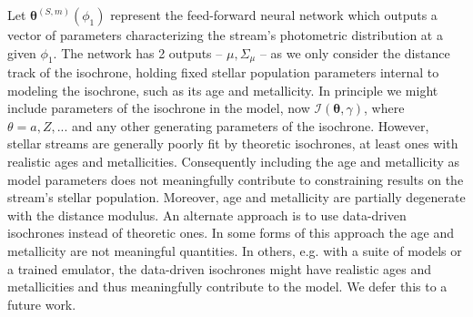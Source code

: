\documentclass[twocolumn]{aastex631}
\newcommand{\mbs}[1]{\boldsymbol{#1}}
\newcommand{\mcal}[1]{\mathcal{#1}}
\newcommand{\smallcomponent}[2]{#2^{\scriptscriptstyle (#1)}}
\newcommand{\cmp}[2]{\smallcomponent{#1}{#2}}
\begin{document}
            Let $\cmp{S,m}{\mbs{\theta}}(\phi_1)$ represent the feed-forward neural network which outputs a vector of parameters characterizing the stream's photometric distribution at a given $\phi_1$. The network has 2 outputs -- $\mu, \Sigma_\mu$ -- as we only consider the distance track of the isochrone, holding fixed stellar population parameters internal to modeling the isochrone, such as its age and metallicity.
            In principle we might include parameters of the isochrone in the model, now $\mcal{I}(\mbs{\theta}, \gamma)$, where $\theta = {a, Z, ...}$ and any other generating parameters of the isochrone.
            However, stellar streams are generally poorly fit by theoretic isochrones, at least ones with realistic ages and metallicities.
            Consequently including the age and metallicity as model parameters
            does not meaningfully contribute to constraining results on the stream's stellar population. Moreover, age and metallicity are partially degenerate with the distance modulus. An alternate approach is to use data-driven isochrones instead of theoretic ones. In some forms of this approach the age and metallicity are not meaningful quantities. In others, e.g. with a suite of models or a trained emulator, the data-driven isochrones might have realistic ages and metallicities and thus meaningfully contribute to the model.
            We defer this to a future work.
\end{document}
